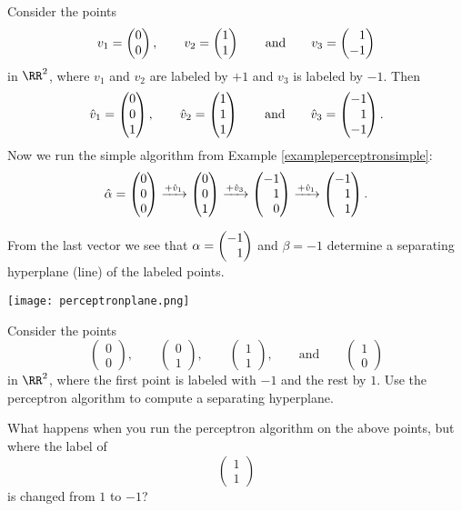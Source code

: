 \documentclass{article}
\newcommand{\vect}[2]{\begin{pmatrix} #1 \\ #2 \end{pmatrix}}
\newcommand{\vects}[3]{\begin{pmatrix} #1 \\ #2 \\ #3\end{pmatrix}}
\newcommand{\hphm}{\hphantom{-}}
\begin{document}
\begin{example}\label{Examplepercep}
Consider the points
$$
v_1 = \vect{0}{0},\qquad v_2=\vect{1}{1}\qquad\text{and}\qquad v_3=\vect{\hphm 1}{-1}
$$
in $\RR^2$, where $v_1$ and $v_2$ are labeled by $+1$ and $v_3$ is labeled by $-1$. Then
$$
\hat{v}_1 = \vects{0}{0}{1},\qquad \hat{v}_2 = \vects{1}{1}{1}\qquad
\text{and}\qquad \hat{v}_3 = \vects{-1}{\hphm 1}{-1}.
$$
Now we run the simple algorithm from Example \ref{exampleperceptronsimple}:
$$
\hat{\alpha} = \vects{0}{0}{0}\xrightarrow{+\hat{v}_1} \vects{0}{0}{1} \xrightarrow{+\hat{v}_3} \vects{-1}{\hphm 1}{\hphm 0} \xrightarrow{+\hat{v}_1} \vects{-1}{\hphm 1}{\hphm 1}.
$$

From the last vector we see that $\alpha = \vect{-1}{\hphm 1}$ and $\beta = -1$ determine
a separating hyperplane (line) of the labeled points.

\texttt{[image: perceptronplane.png]}

\end{example}


\beginshex
Consider the points
$$
\begin{pmatrix}
0 \\ 0
\end{pmatrix},\qquad
\begin{pmatrix}
0 \\ 1
\end{pmatrix},\qquad

\begin{pmatrix}
1 \\ 1
\end{pmatrix},\qquad\text{and}\qquad
\begin{pmatrix}
1 \\ 0
\end{pmatrix}
$$
in $\RR^2$, where the first point is labeled with $-1$ and the rest by $1$.
Use the perceptron algorithm to compute a separating hyperplane.

What happens when you run the perceptron algorithm on the above
points, but where the label of
$$
\begin{pmatrix}
  1 \\ 1
\end{pmatrix}
$$
is changed from $1$ to $-1$?
\endshex
\end{document}
